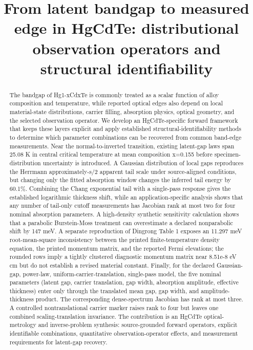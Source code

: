 \documentclass[12pt]{article}
\title{From latent bandgap to measured edge in HgCdTe: distributional observation operators and structural identifiability}
\author{}
\date{}
\begin{document}
\maketitle


\begin{abstract}

The bandgap of Hg1-xCdxTe is commonly treated as a scalar function of alloy composition and temperature, while reported optical edges also depend on local material-state distributions, carrier filling, absorption physics, optical geometry, and the selected observation operator. We develop an HgCdTe-specific forward framework that keeps these layers explicit and apply established structural-identifiability methods to determine which parameter combinations can be recovered from common band-edge measurements. Near the normal-to-inverted transition, existing latent-gap laws span 25.08 K in central critical temperature at mean composition x=0.155 before specimen-distribution uncertainty is introduced. A Gaussian distribution of local gaps reproduces the Herrmann approximately-s/2 apparent tail scale under source-aligned conditions, but changing only the fitted absorption window changes the inferred tail energy by 60.1\%. Combining the Chang exponential tail with a single-pass response gives the established logarithmic thickness shift, while an application-specific analysis shows that any number of tail-only cutoff measurements has Jacobian rank at most two for four nominal absorption parameters. A high-density synthetic sensitivity calculation shows that a parabolic Burstein-Moss treatment can overestimate a declared nonparabolic shift by 147 meV. A separate reproduction of Dingrong Table 1 exposes an 11.297 meV root-mean-square inconsistency between the printed finite-temperature density equation, the printed momentum matrix, and the reported Fermi elevations; the rounded rows imply a tightly clustered diagnostic momentum matrix near 8.51e-8 eV cm but do not establish a revised material constant. Finally, for the declared Gaussian-gap, power-law, uniform-carrier-translation, single-pass model, the five nominal parameters (latent gap, carrier translation, gap width, absorption amplitude, effective thickness) enter only through the translated mean gap, gap width, and amplitude-thickness product. The corresponding dense-spectrum Jacobian has rank at most three. A controlled nontranslational carrier marker raises rank to four but leaves one combined scaling-translation invariance. The contribution is an HgCdTe optical-metrology and inverse-problem synthesis: source-grounded forward operators, explicit identifiable combinations, quantitative observation-operator effects, and measurement requirements for latent-gap recovery.

\end{abstract}
\end{document}
